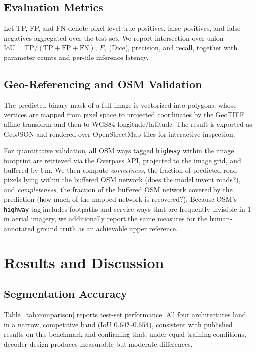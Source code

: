 \documentclass[conference]{IEEEtran}
\begin{document}
\subsection{Evaluation Metrics}
Let TP, FP, and FN denote pixel-level true positives, false positives, and
false negatives aggregated over the test set. We report intersection over
union $\mathrm{IoU} = \mathrm{TP}/(\mathrm{TP}+\mathrm{FP}+\mathrm{FN})$,
$F_1$ (Dice), precision, and recall, together with parameter counts and
per-tile inference latency.

\subsection{Geo-Referencing and OSM Validation}
The predicted binary mask of a full image is vectorized into polygons, whose
vertices are mapped from pixel space to projected coordinates by the GeoTIFF
affine transform and then to WGS84 longitude/latitude. The result is exported
as GeoJSON and rendered over OpenStreetMap tiles for interactive inspection.

For quantitative validation, all OSM ways tagged \texttt{highway} within the
image footprint are retrieved via the Overpass API, projected to the image
grid, and buffered by 6\,m. We then compute \emph{correctness}, the fraction
of predicted road pixels lying within the buffered OSM network (does the model
invent roads?), and \emph{completeness}, the fraction of the buffered OSM
network covered by the prediction (how much of the mapped network is
recovered?). Because OSM's \texttt{highway} tag includes footpaths and service
ways that are frequently invisible in 1\,m aerial imagery, we additionally
report the same measures for the human-annotated ground truth as an achievable
upper reference.

\section{Results and Discussion}

\subsection{Segmentation Accuracy}
Table~\ref{tab:comparison} reports test-set performance. All four
architectures land in a narrow, competitive band (IoU
$0.642$--$0.654$), consistent with published results on this benchmark and
confirming that, under equal training conditions, decoder design produces
measurable but moderate differences.
\end{document}
